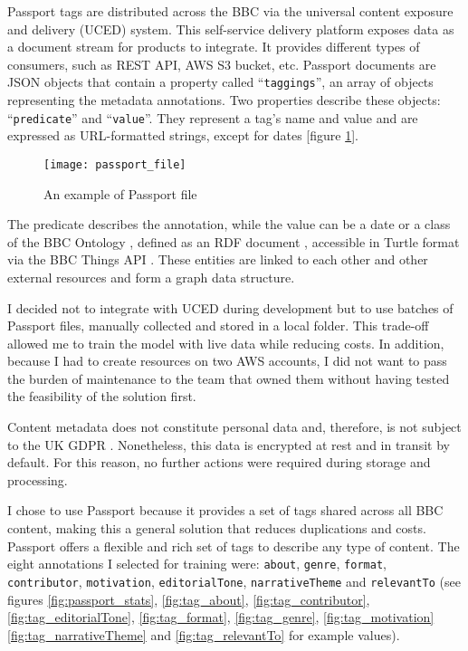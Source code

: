 Passport tags are distributed across the BBC via the universal content exposure and delivery (UCED) system.
This self-service delivery platform exposes data as a document stream for products to integrate.
It provides different types of consumers, such as REST API, AWS S3 bucket, etc.
Passport documents are JSON objects that contain a property called ``\verb|taggings|'', an array of objects representing the
metadata annotations. Two properties describe these objects: ``\verb|predicate|'' and ``\verb|value|''.
They represent a tag's name and value and are expressed as URL-formatted strings, except for dates [figure \ref{fig:passport_file}].

\begin{figure}[h]
  \centering
  \texttt{[image: passport\_file]}
  \caption{An example of Passport file}
  \label{fig:passport_file}
\end{figure}

The predicate describes the annotation, while the value can be a date or a class of the BBC Ontology \cite{BBC:Ontologies},
defined as an RDF document \cite{W3C:RDF,W3C:RDF:Concepts}, accessible in Turtle format \cite{W3C:Turtle}
via the BBC Things API \cite{BBC:Things,BBC:Things:About,BBC:Things:API}.
These entities are linked to each other and other external resources and form a graph data structure.


I decided not to integrate with UCED during development but to use batches of Passport files,
manually collected and stored in a local folder.
This trade-off allowed me to train the model with live data while reducing costs.
In addition, because I had to create resources on two AWS accounts,
I did not want to pass the burden of maintenance to the team that owned them without having tested the feasibility of the solution first.


Content metadata does not constitute personal data and, therefore, is not subject to the UK GDPR  \cite{UKGDPR}.
Nonetheless, this data is encrypted at rest and in transit by default.
For this reason, no further actions were required during storage and processing.


I chose to use Passport because it provides a set of tags shared across all BBC content,
making this a general solution that reduces duplications and costs.
Passport offers a flexible and rich set of tags to describe any type of content.
The eight annotations I selected for training were:
\verb|about|, \verb|genre|, \verb|format|, \verb|contributor|, \verb|motivation|,
\verb|editorialTone|, \verb|narrativeTheme| and \verb|relevantTo|
(see figures \ref{fig:passport_stats}, \ref{fig:tag_about}, \ref{fig:tag_contributor},
\ref{fig:tag_editorialTone}, \ref{fig:tag_format}, \ref{fig:tag_genre}, \ref{fig:tag_motivation}
\ref{fig:tag_narrativeTheme} and \ref{fig:tag_relevantTo} for example values).

